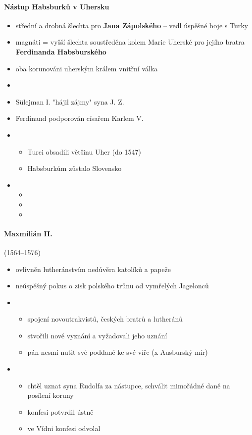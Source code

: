 \paragraph{Nástup Habsburků v Uhersku}
\begin{itemize}
\item střední a drobná šlechta pro \textbf{Jana Zápolského} -- vedl úspěšné boje s Turky
\item magnáti = vyšší šlechta soustředěna kolem Marie Uherské \ra pro jejího bratra \textbf{Ferdinanda Habsburského}
\item oba korunováni uherským králem \ra vnitřní válka
\item {}
\item Sülejman I. "hájil zájmy" syna J. Z.
\item Ferdinand podporován císařem Karlem V.
\item {}
	\begin{itemize}
	\item Turci obsadili většinu Uher (do 1547)
	\item Habsburkům zůstalo Slovensko
	\end{itemize}
\item {}
	\begin{itemize}
	\item 
	\item
	\item 
	\end{itemize}
\end{itemize}

\paragraph{Maxmilián II.}(1564--1576)
\begin{itemize}
\item ovlivněn lutheránstvím \ra nedůvěra katolíků a papeže 
\item neúspěšný pokus o zisk polského trůnu od vymřelých Jagelonců
\item {}
	\begin{itemize}
	\item spojení novoutrakvistů, českých bratrů a lutheránů
	\item stvořili nové vyznání a vyžadovali jeho uznání
	\item pán nesmí nutit své poddané ke své víře (x Ausburský mír)
	\end{itemize}
\item {}
	\begin{itemize}
	\item chtěl uznat syna Rudolfa za nástupce, schválit mimořádné daně na posílení koruny
	\item konfesi potvrdil ústně
	\item ve Vídni konfesi odvolal
	\end{itemize}
\end{itemize}

